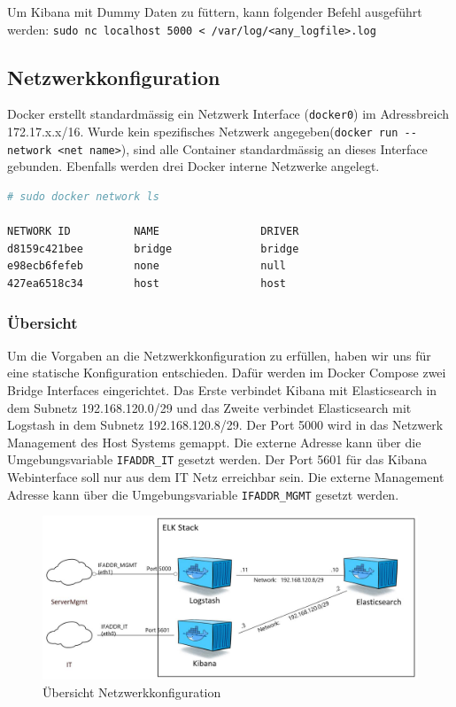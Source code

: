 Um Kibana mit Dummy Daten zu füttern, kann folgender Befehl ausgeführt werden: \lstinline[]|sudo nc localhost 5000 < /var/log/<any_logfile>.log|

\subsection{Netzwerkkonfiguration}
Docker erstellt standardmässig ein Netzwerk Interface (\lstinline[]|docker0|) im Adressbreich 172.17.x.x/16. Wurde kein spezifisches Netzwerk angegeben(\lstinline[]|docker run --network <net name>|), sind alle Container standardmässig an dieses Interface gebunden. Ebenfalls werden drei Docker interne Netzwerke angelegt.
\begin{lstlisting}[language=bash]
# sudo docker network ls

NETWORK ID          NAME                DRIVER
d8159c421bee        bridge              bridge              
e98ecb6fefeb        none                null                
427ea6518c34        host                host    
\end{lstlisting}

\subsubsection{Übersicht}
\label{sec:docker_networkconf}
Um die Vorgaben an die Netzwerkkonfiguration zu erfüllen, haben wir uns für eine statische Konfiguration entschieden. Dafür werden im Docker Compose zwei Bridge Interfaces eingerichtet. Das Erste verbindet Kibana mit Elasticsearch in dem Subnetz 192.168.120.0/29 und das Zweite verbindet Elasticsearch mit Logstash in dem Subnetz 192.168.120.8/29. Der Port 5000 wird in das Netzwerk Management des Host Systems gemappt. Die externe Adresse kann über die Umgebungsvariable \lstinline[]|IFADDR_IT| gesetzt werden. Der Port 5601 für das Kibana Webinterface soll nur aus dem IT Netz erreichbar sein. Die externe Management Adresse kann über die Umgebungsvariable \lstinline[]|IFADDR_MGMT| gesetzt werden.
\begin{figure}[h]
\centering
\includegraphics[width=0.7\linewidth]{images/docker_network_conf}
\caption{Übersicht Netzwerkkonfiguration}
\label{fig:dockernetworkconf}
\end{figure}
\newpage


